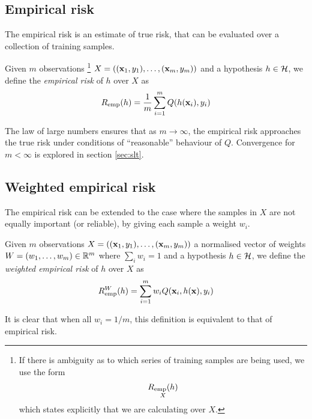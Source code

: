 \subsection{Empirical risk}
\label{sec:empirical risk}
The empirical risk is an estimate of true risk, that can be evaluated
over a collection of training samples.

\begin{definition}
Given $m$ observations
\footnote{If there is ambiguity as to which series of training samples
are being used, we use the form
%
\begin{equation*}
\underset{X}{R_{\mathrm{emp}}(h)}
\end{equation*}
%
which states explicitly that we are calculating over $X$.}
$X = ((\mathbf{x}_1, y_1), \ldots, (\mathbf{x}_m, y_m))$ and a hypothesis $h \in
\mathcal{H}$, we define the \emph{empirical risk} of $h$ over $X$ as 
%
\begin{equation}
R_{\mathrm{emp}}(h) = \frac{1}{m} \sum_{i=1}^{m} Q(h(\mathbf{x}_i), y_i)
\end{equation}
\end{definition}

The law of large numbers ensures that as $m \rightarrow \infty$, the
empirical risk approaches the true risk under conditions of
``reasonable'' behaviour of $Q$.  Convergence for $m < \infty$  is
explored in section \ref{sec:slt}.

\subsection{Weighted empirical risk}
\label{sec:weighted empirical risk}

The empirical risk can be extended to the case where the samples in
$X$ are not equally important (or reliable), by giving each sample a
weight $w_i$.

\begin{definition}
\label{def:weighted empirical risk}
Given $m$ observations $X = ((\mathbf{x}_1, y_1), \ldots, (\mathbf{x}_m,
y_m))$ a normalised vector of weights $W = (w_1, \ldots, w_m) \in
\mathbb{R}^m$ where $\sum_{i} w_i = 1$ and a hypothesis $h \in
\mathcal{H}$, we define the \emph{weighted empirical risk} of $h$ over $X$ as 
%
\begin{equation}
R_{\mathrm{emp}}^W(h) = \sum_{i=1}^{m} w_i Q(\mathbf{x}_i, h(\mathbf{x}), y_i)
\end{equation}
\end{definition}
%
It is clear that when all $w_i = 1/m$, this definition is equivalent
to that of empirical risk.

